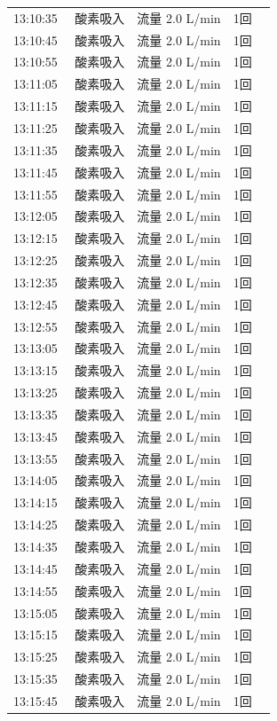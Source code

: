 \documentclass[UTF8,10pt,a4paper,fontset=fandol]{ctexart}
\begin{document}
\begin{minipage}[t]{0.48\linewidth}
\begin{tabular}{@{}p{0.22\linewidth}p{0.72\linewidth}@{}}
13:10:35 & 酸素吸入　流量 2.0 L/min　1回\\
13:10:45 & 酸素吸入　流量 2.0 L/min　1回\\
13:10:55 & 酸素吸入　流量 2.0 L/min　1回\\
13:11:05 & 酸素吸入　流量 2.0 L/min　1回\\
13:11:15 & 酸素吸入　流量 2.0 L/min　1回\\
13:11:25 & 酸素吸入　流量 2.0 L/min　1回\\
13:11:35 & 酸素吸入　流量 2.0 L/min　1回\\
13:11:45 & 酸素吸入　流量 2.0 L/min　1回\\
13:11:55 & 酸素吸入　流量 2.0 L/min　1回\\
13:12:05 & 酸素吸入　流量 2.0 L/min　1回\\
13:12:15 & 酸素吸入　流量 2.0 L/min　1回\\
13:12:25 & 酸素吸入　流量 2.0 L/min　1回\\
13:12:35 & 酸素吸入　流量 2.0 L/min　1回\\
13:12:45 & 酸素吸入　流量 2.0 L/min　1回\\
13:12:55 & 酸素吸入　流量 2.0 L/min　1回\\
13:13:05 & 酸素吸入　流量 2.0 L/min　1回\\
13:13:15 & 酸素吸入　流量 2.0 L/min　1回\\
13:13:25 & 酸素吸入　流量 2.0 L/min　1回\\
13:13:35 & 酸素吸入　流量 2.0 L/min　1回\\
13:13:45 & 酸素吸入　流量 2.0 L/min　1回\\
13:13:55 & 酸素吸入　流量 2.0 L/min　1回\\
13:14:05 & 酸素吸入　流量 2.0 L/min　1回\\
13:14:15 & 酸素吸入　流量 2.0 L/min　1回\\
13:14:25 & 酸素吸入　流量 2.0 L/min　1回\\
13:14:35 & 酸素吸入　流量 2.0 L/min　1回\\
13:14:45 & 酸素吸入　流量 2.0 L/min　1回\\
13:14:55 & 酸素吸入　流量 2.0 L/min　1回\\
13:15:05 & 酸素吸入　流量 2.0 L/min　1回\\
13:15:15 & 酸素吸入　流量 2.0 L/min　1回\\
13:15:25 & 酸素吸入　流量 2.0 L/min　1回\\
13:15:35 & 酸素吸入　流量 2.0 L/min　1回\\
13:15:45 & 酸素吸入　流量 2.0 L/min　1回\\

\end{tabular}
\end{minipage}
\end{document}
